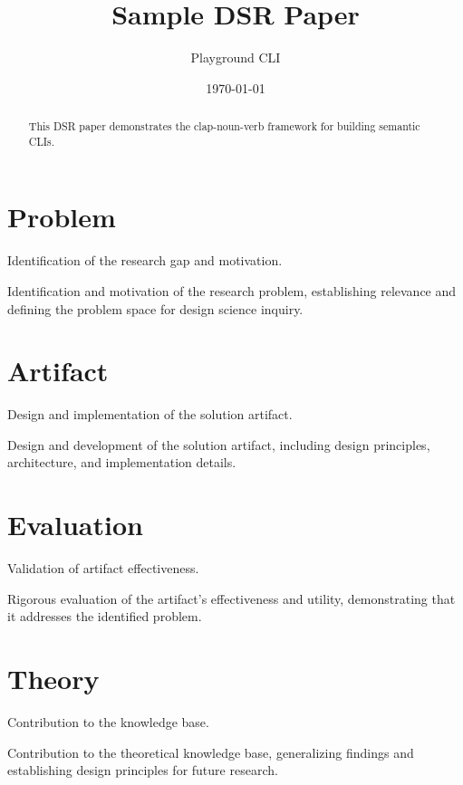 \documentclass{article}
\title{Sample DSR Paper}
\author{Playground CLI}
\date{\today}
\begin{document}
\maketitle

\begin{abstract}
This DSR paper demonstrates the clap-noun-verb framework for building semantic CLIs.
\end{abstract}


\section{Problem}
Identification of the research gap and motivation.

Identification and motivation of the research problem, establishing relevance and defining the problem space for design science inquiry.

\section{Artifact}
Design and implementation of the solution artifact.

Design and development of the solution artifact, including design principles, architecture, and implementation details.

\section{Evaluation}
Validation of artifact effectiveness.

Rigorous evaluation of the artifact's effectiveness and utility, demonstrating that it addresses the identified problem.

\section{Theory}
Contribution to the knowledge base.

Contribution to the theoretical knowledge base, generalizing findings and establishing design principles for future research.



\end{document}
